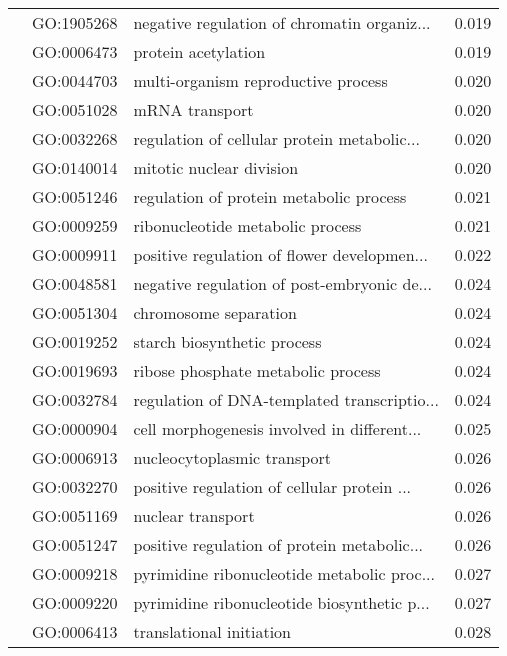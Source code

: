 \begin{longtable}{lllr}
   & GO:1905268 &  negative regulation of chromatin organiz... &         0.019 \\
   & GO:0006473 &                          protein acetylation &         0.019 \\
   & GO:0044703 &          multi-organism reproductive process &         0.020 \\
   & GO:0051028 &                               mRNA transport &         0.020 \\
   & GO:0032268 &  regulation of cellular protein metabolic... &         0.020 \\
   & GO:0140014 &                     mitotic nuclear division &         0.020 \\
   & GO:0051246 &      regulation of protein metabolic process &         0.021 \\
   & GO:0009259 &             ribonucleotide metabolic process &         0.021 \\
   & GO:0009911 &  positive regulation of flower developmen... &         0.022 \\
   & GO:0048581 &  negative regulation of post-embryonic de... &         0.024 \\
   & GO:0051304 &                        chromosome separation &         0.024 \\
   & GO:0019252 &                  starch biosynthetic process &         0.024 \\
   & GO:0019693 &           ribose phosphate metabolic process &         0.024 \\
   & GO:0032784 &  regulation of DNA-templated transcriptio... &         0.024 \\
   & GO:0000904 &  cell morphogenesis involved in different... &         0.025 \\
   & GO:0006913 &                  nucleocytoplasmic transport &         0.026 \\
   & GO:0032270 &  positive regulation of cellular protein ... &         0.026 \\
   & GO:0051169 &                            nuclear transport &         0.026 \\
   & GO:0051247 &  positive regulation of protein metabolic... &         0.026 \\
   & GO:0009218 &  pyrimidine ribonucleotide metabolic proc... &         0.027 \\
   & GO:0009220 &  pyrimidine ribonucleotide biosynthetic p... &         0.027 \\
   & GO:0006413 &                     translational initiation &         0.028 \\

\end{longtable}
